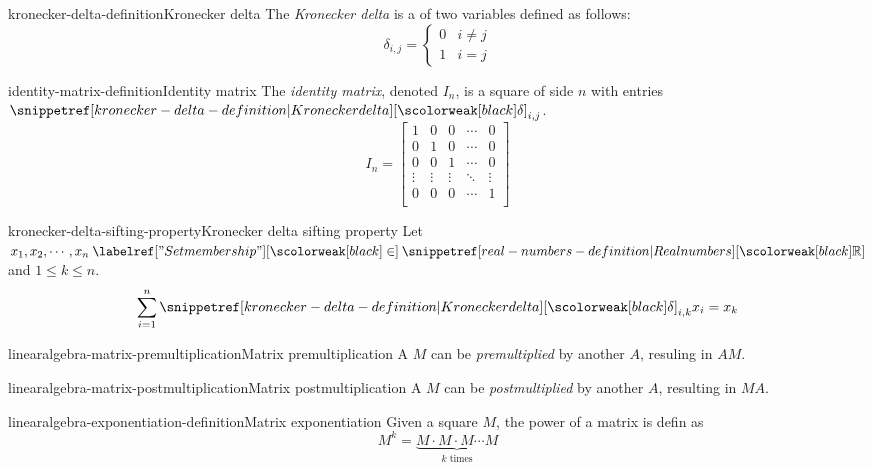 \documentclass[preview]{standalone}
\begin{document}
\begin{snippetdefinition}{kronecker-delta-definition}{Kronecker delta}
    The \emph{Kronecker delta} is a \function of two variables
    defined as follows:
    \[
        \delta_{i,j} = \begin{cases}
            0 & i \neq j \\
            1 & i = j
        \end{cases}
    \]
\end{snippetdefinition}

\begin{snippetdefinition}{identity-matrix-definition}{Identity matrix}
    The \textit{identity matrix}, denoted \(I_n\),
    is a square \matrix of side \(n\)
    with entries \(\kronecker_{i,j}\).
    \[
    I_n=
        \begin{bmatrix}
            1 & 0 & 0 & \cdots & 0 \\
            0 & 1 & 0 & \cdots & 0 \\
            0 & 0 & 1 & \cdots & 0 \\
            \vdots & \vdots & \vdots & \ddots & \vdots \\
            0 & 0 & 0 & \cdots & 1 \\
        \end{bmatrix}
    \]
\end{snippetdefinition}

\begin{snippetproposition}{kronecker-delta-sifting-property}{Kronecker delta sifting property}
    Let \(x_1, x_2, \cdots, x_n \in \realnumbers\)
    and \(1 \leq k \leq n\).
    \[
        \sum_{i=1}^n \kronecker_{i,k}x_i = x_k
    \]
\end{snippetproposition}

\begin{snippetdefinition}{linearalgebra-matrix-premultiplication}{Matrix premultiplication}
    A \matrix \(M\) can be \textit{premultiplied}
    by another \matrix \(A\), resuling in \(AM\).
\end{snippetdefinition}

\begin{snippetdefinition}{linearalgebra-matrix-postmultiplication}{Matrix postmultiplication}
    A \matrix \(M\) can be \textit{postmultiplied}
    by another \matrix \(A\), resulting in \(MA\).
\end{snippetdefinition}

\begin{snippetdefinition}{linearalgebra-exponentiation-definition}{Matrix exponentiation}
    Given a square \matrix \(M\), the power of a matrix
    is defin as
    \[
        M^k = \underbrace{M\cdot M \cdot M \cdots M}_{k \text{ times}}
    \]
\end{snippetdefinition}
\end{document}

